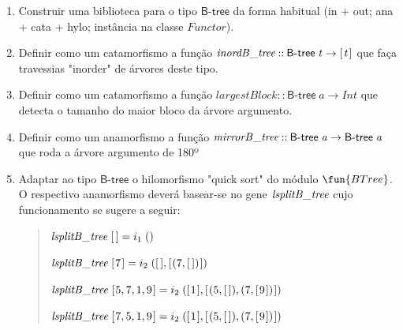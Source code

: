 \documentclass[a4paper]{article}
\newcommand{\Conid}[1]{\mathit{#1}}
\newcommand{\Varid}[1]{\mathit{#1}}
\begin{document}
\begin{enumerate}
\item	Construir uma biblioteca para o tipo \ensuremath{\mathsf{B}\mbox{-}\mathsf{tree} } da forma habitual
        (in + out; ana + cata + hylo; instância na classe \ensuremath{\Conid{Functor}}).
\item
	Definir como um catamorfismo a função \ensuremath{\Varid{inordB\char95 tree}\mathbin{::}\mathsf{B}\mbox{-}\mathsf{tree} \;\Varid{t}\to [\mskip1.5mu \Varid{t}\mskip1.5mu]}
        que faça travessias "inorder" de árvores deste tipo.
\item
	Definir como um catamorfismo a função \ensuremath{\Varid{largestBlock}\mathbin{::}\mathsf{B}\mbox{-}\mathsf{tree} \;\Varid{a}\to \Conid{Int}}
        que detecta o tamanho do maior bloco da árvore argumento.
\item
	Definir como um anamorfismo a função \ensuremath{\Varid{mirrorB\char95 tree}\mathbin{::}\mathsf{B}\mbox{-}\mathsf{tree} \;\Varid{a}\to \mathsf{B}\mbox{-}\mathsf{tree} \;\Varid{a}}
        que roda a árvore argumento de 180º
\item
	Adaptar ao tipo \ensuremath{\mathsf{B}\mbox{-}\mathsf{tree} } o hilomorfismo "quick sort" do módulo \ensuremath{\fun{BTree} }.
	O respectivo anamorfismo deverá basear-se no gene \ensuremath{\Varid{lsplitB\char95 tree}}
	cujo funcionamento se sugere a seguir:
\begin{quote}
\ensuremath{\Varid{lsplitB\char95 tree}\;[\mskip1.5mu \mskip1.5mu]\mathrel{=}i_1\;()}

\ensuremath{\Varid{lsplitB\char95 tree}\;[\mskip1.5mu \mathrm{7}\mskip1.5mu]\mathrel{=}i_2\;([\mskip1.5mu \mskip1.5mu],[\mskip1.5mu (\mathrm{7},[\mskip1.5mu \mskip1.5mu])\mskip1.5mu])}

\ensuremath{\Varid{lsplitB\char95 tree}\;[\mskip1.5mu \mathrm{5},\mathrm{7},\mathrm{1},\mathrm{9}\mskip1.5mu]\mathrel{=}i_2\;([\mskip1.5mu \mathrm{1}\mskip1.5mu],[\mskip1.5mu (\mathrm{5},[\mskip1.5mu \mskip1.5mu]),(\mathrm{7},[\mskip1.5mu \mathrm{9}\mskip1.5mu])\mskip1.5mu])}

\ensuremath{\Varid{lsplitB\char95 tree}\;[\mskip1.5mu \mathrm{7},\mathrm{5},\mathrm{1},\mathrm{9}\mskip1.5mu]\mathrel{=}i_2\;([\mskip1.5mu \mathrm{1}\mskip1.5mu],[\mskip1.5mu (\mathrm{5},[\mskip1.5mu \mskip1.5mu]),(\mathrm{7},[\mskip1.5mu \mathrm{9}\mskip1.5mu])\mskip1.5mu])}
\end{quote}


\end{enumerate}
\end{document}
